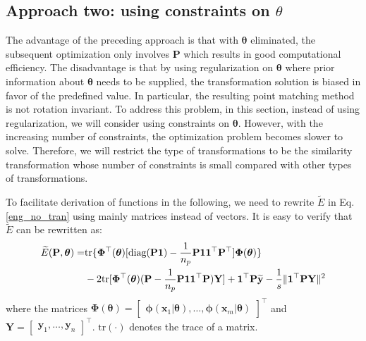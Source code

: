 \documentclass[11pt,bezier,]{article}
\begin{document}
\subsection{Approach two: using constraints on $\theta$}
The advantage of the preceding approach is that
with $\boldsymbol\theta$ eliminated,
the subsequent optimization only involves $\mathbf P$
which results in good computational efficiency.
The disadvantage  is that
by using regularization on $\boldsymbol\theta$ where
prior information about $\boldsymbol\theta$ needs to be supplied,
the transformation solution is biased in favor of  the predefined value.
In particular,
the resulting point matching method is not rotation invariant. %
To address this problem,
in this section, instead of using regularization,
we will consider using  constraints  on $\boldsymbol\theta$.
However, with the increasing number of constraints,
the optimization problem becomes slower to solve.
Therefore, 
we will restrict the type of transformations to be the similarity transformation
whose number of constraints is small compared with other types of transformations.


To facilitate derivation of functions in the following,
we need to  rewrite   $\widetilde E$ in Eq. \eqref{eng_no_tran} 
using mainly  matrices instead of vectors.
It is easy to verify that   $\widetilde E$ can be 
rewritten as:
\begin{align}
 \widetilde E(\mathbf P,{\boldsymbol\theta})= &
\text{tr} \{\mathbf\Phi^\top(\boldsymbol\theta) [\text{diag}(\mathbf P\mathbf 1)
-\frac{1}{n_p} \mathbf P\mathbf 1 \mathbf 1^\top\mathbf P^\top]\mathbf\Phi(\boldsymbol\theta)\} \notag\\
& -2\text{tr}[\mathbf\Phi^\top(\boldsymbol\theta)
(\mathbf P-\frac{1}{n_p}\mathbf P\mathbf 1\mathbf 1^\top\mathbf P)\mathbf Y]
+\mathbf 1^\top\mathbf P\mathbf{\widetilde y} -\frac{1}{s}\|\mathbf 1^\top\mathbf P\mathbf Y\|^2  \label{eng_no_tran_mat}
\end{align}
where the matrices
$\mathbf\Phi(\boldsymbol\theta)=\begin{bmatrix}
                       \boldsymbol\phi(\mathbf x_1|\boldsymbol\theta),\ldots,\boldsymbol\phi(\mathbf x_m|\boldsymbol\theta)
                      \end{bmatrix}^\top$ and
$\mathbf Y=\begin{bmatrix}
    \mathbf y_1,\ldots,\mathbf y_n
   \end{bmatrix}^\top
$.
$\text{tr}(\cdot)$ denotes the trace of a matrix.
\end{document}
